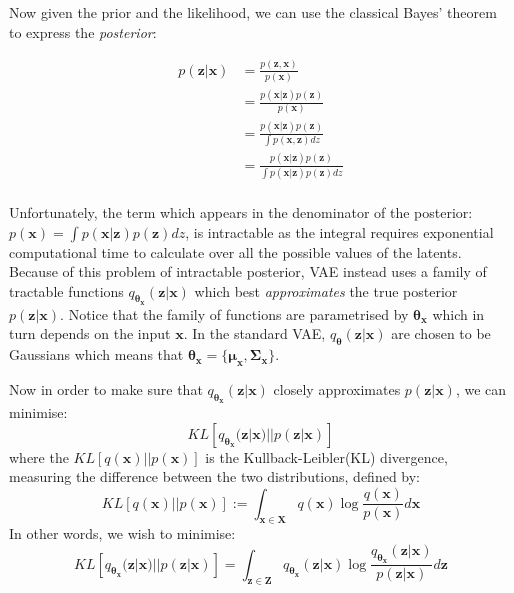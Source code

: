                 Now given the prior and the likelihood, we can use the classical Bayes' theorem to express the \textit{posterior}:
                
                \begin{align*} 
                    p(\bm{z}|\bm{x}) &= \frac{p(\bm{z},\bm{x})}{p(\bm{x})}\\
                    &= \frac{p(\bm{x} | \bm{z})p(\bm{z})}{p(\bm{x})}\\
                    &= \frac{p(\bm{x} | \bm{z})p(\bm{z})}{\int p(\bm{x}, \bm{z}) dz}\\
                    &= \frac{p(\bm{x} | \bm{z})p(\bm{z})}{\int p(\bm{x} | \bm{z}) p(\bm{z}) dz}\\
                \end{align*}

                Unfortunately, the term which appears in the denominator of the posterior: $p(\bm{x}) = \int p(\bm{x} | \bm{z}) p(\bm{z}) dz$, is intractable as the integral requires exponential computational time to calculate over all the possible values of the latents. Because of this problem of intractable posterior, VAE instead uses a family of tractable functions $q_{\bm{\theta_x}}(\bm{z}|\bm{x})$ which best \textit{approximates} the true posterior $p(\bm{z}|\bm{x})$. Notice that the family of functions are parametrised by $\bm{\theta_x}$ which in turn depends on the input $\bm{x}$. In the standard VAE, $q_{\bm{\theta}}(\bm{z}|\bm{x})$ are chosen to be Gaussians which means that $\bm{\theta_x}= \{\bm{\mu_x}, \bm{\Sigma_x}\}$.
                
                Now in order to make sure that $q_{\bm{\theta_x}}(\bm{z}|\bm{x})$ closely approximates $p(\bm{z}|\bm{x})$, we can minimise:
                    \[ KL\left[q_{\bm{\theta_x}}(\bm{z}|\bm{x}) || p(\bm{z}|\bm{x})\right] \]
                where the $KL\left[q(\bm{x}) || p(\bm{x})\right]$ is the Kullback-Leibler(KL) divergence, measuring the difference between the two distributions, defined by:
                    \[ KL\left[q(\bm{x}) || p(\bm{x})\right] := \int_{\bm{x} \in \bm{X}} q(\bm{x}) \log \frac{q(\bm{x})}{p(\bm{x})} d\bm{x}\]
                In other words, we wish to minimise:
                    \[ KL\left[q_{\bm{\theta_x}}(\bm{z}|\bm{x}) || p(\bm{z}|\bm{x})\right] = \int_{\bm{z} \in \bm{Z}} q_{\bm{\theta_x}}(\bm{z}|\bm{x}) \log \frac{q_{\bm{\theta_x}}(\bm{z}|\bm{x})}{p(\bm{z}|\bm{x})} d\bm{z}\]
                
